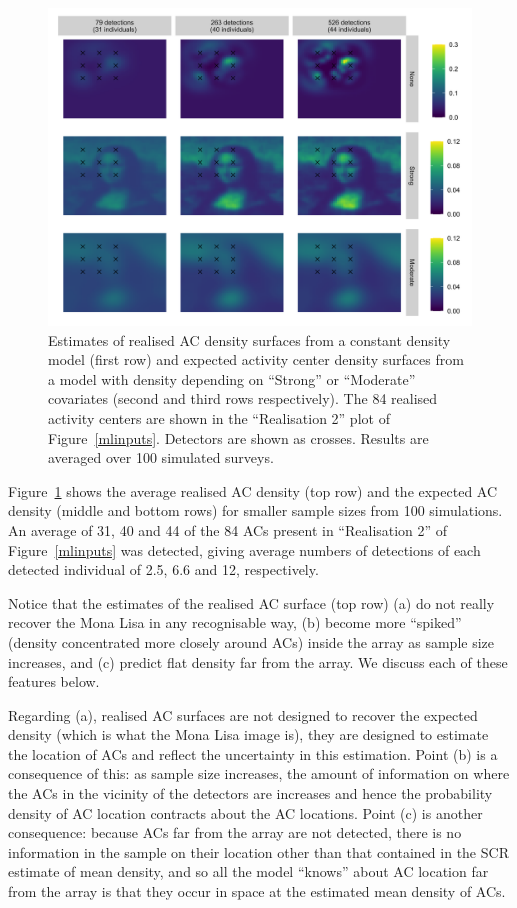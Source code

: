 \documentclass[10pt,a4paper]{article}
\begin{document}
\begin{figure}[htbp]
\centering
\includegraphics[width=1\textwidth]{mona_peaky_avgd.png}
\caption{Estimates of realised AC density surfaces from a constant density model (first row) and expected activity center density surfaces from a model with density depending on ``Strong'' or ``Moderate'' covariates (second and third rows respectively). The 84 realised activity centers are shown in the ``Realisation 2'' plot of Figure~\ref{mlinputs}. Detectors are shown as crosses. Results are averaged over 100 simulated surveys.}
\label{mona_peaky_avgd}
\end{figure}

Figure~\ref{mona_peaky_avgd} shows the average realised AC density (top row) and the expected AC density (middle and bottom rows) for smaller sample sizes  from 100 simulations. An average of 31, 40 and 44 of the 84 ACs present in ``Realisation 2'' of Figure~\ref{mlinputs} was detected, giving average numbers of detections of each detected individual of 2.5, 6.6 and 12, respectively.

Notice that the estimates of the realised AC surface (top row) (a) do not really recover the Mona Lisa in any recognisable way, (b) become more ``spiked'' (density concentrated more closely around ACs) inside the array as sample size increases, and (c) predict flat density far from the array. We discuss each of these features below.

Regarding (a), realised AC surfaces are not designed to recover the expected density (which is what the Mona Lisa image is), they are designed to estimate the location of ACs and reflect the uncertainty in this estimation. Point (b) is a consequence of this: as sample size increases, the amount of information on where the ACs in the vicinity of the detectors are increases and hence the probability density of AC location contracts about the AC locations. Point (c) is another consequence: because ACs far from the array are not detected, there is no information in the sample on their location other than that contained in the SCR estimate of mean density, and so all the model ``knows'' about AC location far from the array is that they occur in space at the estimated mean density of ACs. 
\end{document}
